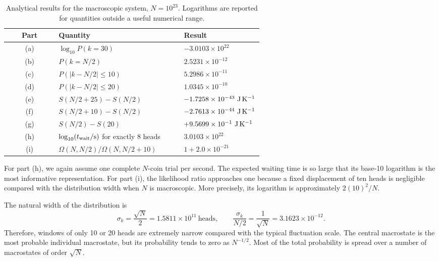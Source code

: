 \documentclass[10pt,a4paper]{article}
\begin{document}
\begin{table}[htbp]
  \centering
  \caption{Analytical results for the macroscopic system, $N=10^{23}$. Logarithms are reported for quantities outside a useful numerical range.}
  \label{tab:largeN-results}
  \small
  \begin{tabular}{c p{0.49\linewidth} p{0.31\linewidth}}
    \toprule
    Part & Quantity & Result \\
    \midrule
    (a) & $\log_{10}P(k=30)$ & $-3.0103\times10^{22}$ \\
    (b) & $P(k=N/2)$ & $2.5231\times10^{-12}$ \\
    (c) & $P(|k-N/2|\leq10)$ & $5.2986\times10^{-11}$ \\
    (d) & $P(|k-N/2|\leq20)$ & $1.0345\times10^{-10}$ \\
    (e) & $S(N/2+25)-S(N/2)$ & $-1.7258\times10^{-43}\ {\rm J\,K^{-1}}$ \\
    (f) & $S(N/2+10)-S(N/2)$ & $-2.7613\times10^{-44}\ {\rm J\,K^{-1}}$ \\
    (g) & $S(N/2)-S(20)$ & $+9.5699\times10^{-1}\ {\rm J\,K^{-1}}$ \\
    (h) & $\log_{10}(t_{\rm wait}/{\rm s})$ for exactly 8 heads & $3.0103\times10^{22}$ \\
    (i) & $\Omega(N,N/2)/\Omega(N,N/2+10)$ & $1+2.0\times10^{-21}$ \\
    \bottomrule
  \end{tabular}
\end{table}
For part (h), we again assume one complete $N$-coin trial per second. The expected waiting time is so large that its base-10 logarithm is the most informative representation. For part (i), the likelihood ratio approaches one because a fixed displacement of ten heads is negligible compared with the distribution width when $N$ is macroscopic. More precisely, its logarithm is approximately $2(10)^2/N$.

The natural width of the distribution is
\begin{equation}
  \sigma_k=\frac{\sqrt N}{2}=1.5811\times10^{11}\ \text{heads},\qquad
  \frac{\sigma_k}{N/2}=\frac{1}{\sqrt N}=3.1623\times10^{-12}.
  \label{eq:largeN-fluctuations}
\end{equation}
Therefore, windows of only 10 or 20 heads are extremely narrow compared with the typical fluctuation scale. The central macrostate is the most probable individual macrostate, but its probability tends to zero as $N^{-1/2}$. Most of the total probability is spread over a number of macrostates of order $\sqrt N$.
\end{document}
